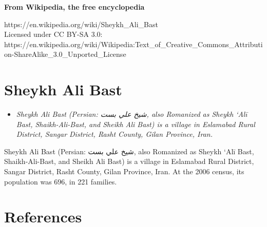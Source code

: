\textbf{From Wikipedia, the free encyclopedia}

https://en.wikipedia.org/wiki/Sheykh\_Ali\_Bast\\
Licensed under CC BY-SA 3.0:\\
https://en.wikipedia.org/wiki/Wikipedia:Text\_of\_Creative\_Commons\_Attribution-ShareAlike\_3.0\_Unported\_License

\section{Sheykh Ali Bast}\label{sheykh-ali-bast}

\begin{itemize}
\item
  \emph{Sheykh Ali Bast (Persian: شيخ علي بست‎, also Romanized as Sheykh
  `Alī Bast, Shaikh-Ali-Bast, and Sheikh Ali Bast) is a village in
  Eslamabad Rural District, Sangar District, Rasht County, Gilan
  Province, Iran.}
\end{itemize}

Sheykh Ali Bast (Persian: شيخ علي بست‎, also Romanized as Sheykh `Alī
Bast, Shaikh-Ali-Bast, and Sheikh Ali Bast) is a village in Eslamabad
Rural District, Sangar District, Rasht County, Gilan Province, Iran. At
the 2006 census, its population was 696, in 221 families.

\section{References}\label{references}

